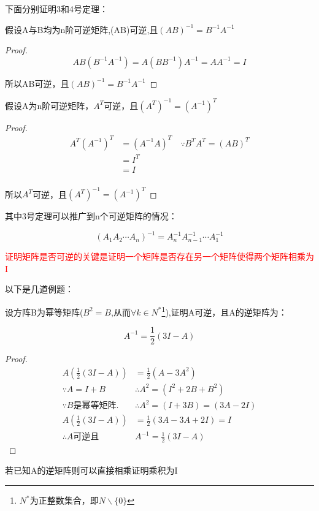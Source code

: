 下面分别证明3和4号定理：

\begin{example}
	假设A与B均为n阶可逆矩阵,(AB)可逆,且$(AB)^{-1}=B^{-1}A^{-1}$

	\begin{proof}
		$$
			AB(B^{-1}A^{-1})=A(BB^{-1})A^{-1}=AA^{-1}=I
		$$

		所以AB可逆，且$(AB)^{-1}=B^{-1}A^{-1}$
	\end{proof}
\end{example}

\begin{example}
	假设A为n阶可逆矩阵，$A^T$可逆，且$(A^T)^{-1}=(A^{-1})^T$

	\begin{proof}
		$$
			\begin{aligned}
				A^T(A^{-1})^T & =(A^{-1}A)^T\quad \because B^TA^T=(AB)^T \\
				              & =I^T                                     \\
				              & =I                                       \\
			\end{aligned}
		$$

		所以$A^T$可逆，且$(A^T)^{-1}=(A^{-1})^T$
	\end{proof}
\end{example}

其中3号定理可以推广到n个可逆矩阵的情况：

$$
	(A_1A_2\cdots A_n)^{-1}=A_n^{-1}A_{n-1}^{-1}\cdots A_1^{-1}  $$

\textcolor{red}{证明矩阵是否可逆的关键是证明一个矩阵是否存在另一个矩阵使得两个矩阵相乘为I}

以下是几道例题：

\begin{example}

	设方阵B为幂等矩阵($B^2=B$,从而$\forall  k\in N^*$\footnote[1]{$N^*$为正整数集合，即$N\backslash\{0\}$}),证明A可逆，且A的逆矩阵为：

	$$ A^{-1}=\frac{1}{2}(3I-A) $$

	\begin{proof}
		$$
			\begin{aligned}
				A(\frac{1}{2}(3I-A))              & =\frac{1}{2}(A-3A^2)          \\
				\because A=I+B \quad              & \therefore A^2=(I^2+2B+B^2)   \\
				\because B\mbox{是幂等矩阵}.\quad & \therefore A^2=(I+3B)=(3A-2I) \\
				A(\frac{1}{2}(3I-A))              & =\frac{1}{2}(3A-3A+2I)=I      \\
				\therefore A\mbox{可逆且}         & A^{-1}=\frac{1}{2}(3I-A)
			\end{aligned}
		$$
	\end{proof}
	\begin{note}
		若已知A的逆矩阵则可以直接相乘证明乘积为I
	\end{note}
\end{example}

